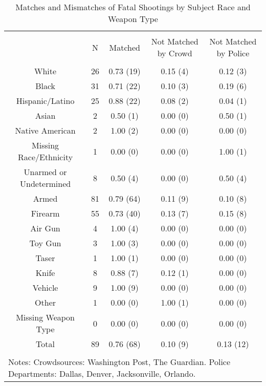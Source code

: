 
\begin{table}[!htbp] \centering 
  \caption{Matches and Mismatches of Fatal Shootings by Subject Race and Weapon Type} 
  \label{} 
\footnotesize 
\begin{tabular}{@{\extracolsep{5pt}} ccccc} 
\\[-1.8ex]\hline 
\hline \\[-1.8ex] 
 & N & Matched & Not Matched by Crowd & Not Matched by Police \\ 
\hline \\[-1.8ex] 
White & 26 & 0.73 (19) & 0.15 (4) & 0.12 (3) \\ 
Black & 31 & 0.71 (22) & 0.10 (3) & 0.19 (6) \\ 
Hispanic/Latino & 25 & 0.88 (22) & 0.08 (2) & 0.04 (1) \\ 
Asian & 2 & 0.50 (1) & 0.00 (0) & 0.50 (1) \\ 
Native American & 2 & 1.00 (2) & 0.00 (0) & 0.00 (0) \\ 
Missing Race/Ethnicity & 1 & 0.00 (0) & 0.00 (0) & 1.00 (1) \\ 
Unarmed or Undetermined & 8 & 0.50 (4) & 0.00 (0) & 0.50 (4) \\ 
Armed & 81 & 0.79 (64) & 0.11 (9) & 0.10 (8) \\ 
Firearm & 55 & 0.73 (40) & 0.13 (7) & 0.15 (8) \\ 
Air Gun & 4 & 1.00 (4) & 0.00 (0) & 0.00 (0) \\ 
Toy Gun & 3 & 1.00 (3) & 0.00 (0) & 0.00 (0) \\ 
Taser & 1 & 1.00 (1) & 0.00 (0) & 0.00 (0) \\ 
Knife & 8 & 0.88 (7) & 0.12 (1) & 0.00 (0) \\ 
Vehicle & 9 & 1.00 (9) & 0.00 (0) & 0.00 (0) \\ 
Other & 1 & 0.00 (0) & 1.00 (1) & 0.00 (0) \\ 
Missing Weapon Type & 0 & 0.00 (0) & 0.00 (0) & 0.00 (0) \\ 
Total & 89 & 0.76 (68) & 0.10 (9) & 0.13 (12) \\ 
\hline \\[-1.8ex] 
\multicolumn{5}{l}{Notes: Crowdsources: Washington Post, The Guardian. Police Departments: Dallas, Denver, Jacksonville, Orlando.} \\ 
\end{tabular} 
\end{table}  
